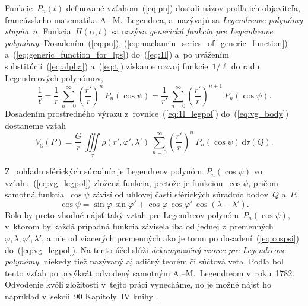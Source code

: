 \documentclass[a4paper, 12pt]{book}
\newcommand{\diff}{\mathrm d}
\newcommand{\gidx}{\mathrm g}
\begin{document}
Funkcie~$P_n(t)$ definované vzťahom~(\ref{eq:pn}) dostali názov podľa ich 
objaviteľa, francúzskeho matematika A.--M.~Legendrea, a~nazývajú sa 
\emph{Legendreove polynómy stupňa~$n$}.  Funkcia~$H(\alpha, t)$ sa nazýva 
\emph{generická funkcia pre Legendreove polynómy}.  Dosadením~(\ref{eq:pn}), 
(\ref{eq:maclaurin_series_of_generic_function}) 
a~(\ref{eq:generic_function_for_lps}) do~(\ref{eq:1l}) a~po uvážením 
substitúcií~(\ref{eq:alpha}) a~(\ref{eq:t}) získame rozvoj funkcie~$1 \slash 
\ell$ do radu Legendreových polynómov,
%
\begin{equation}
\label{eq:1l_legpol}
\frac{1}{\ell} = \frac{1}{r} \, \sum_{n = 0}^\infty \left( \frac{r'}{r} 
\right)^{n} \, P_n(\cos\psi) = \frac{1}{r'} \, \sum_{n = 0}^\infty \left( 
\frac{r'}{r} \right)^{n + 1} \, P_n(\cos\psi){.}
\end{equation}
%
Dosadením prostredného výrazu z~rovnice~(\ref{eq:1l_legpol}) 
do~(\ref{eq:vg_body})
dostaneme vzťah
%
\begin{equation}
\label{eq:vg_legpol}
V_\gidx(P) = \frac{G}{r} \, \iiint\limits_{\tau} \rho(r', \varphi', \lambda') 
\, \sum_{n = 0}^{\infty} \left( \frac{r'}{r} \right)^n \, P_n(\cos\psi) \, 
\diff\tau(Q){.}
\end{equation}

Z~pohľadu sférických súradníc je Legendreov polynóm~$P_n(\cos\psi)$ vo 
vzťahu~(\ref{eq:vg_legpol}) zložená funkcia, pretože je funkciou~$\cos\psi$, 
pričom samotná funkcia~$\cos\psi$ závisí od uhlovej časti sférických súradníc 
bodov~$Q$ a~$P$,
%
\begin{equation}
\label{eq:cospsi}
\cos\psi = \sin\varphi \, \sin\varphi' + \cos\varphi \, \cos\varphi' \,
\cos(\lambda - \lambda'){.}
\end{equation}
%
Bolo by preto vhodné nájsť taký vzťah pre Legendreov polynóm~$P_n(\cos\psi)$,
v~ktorom by každá prípadná funkcia závisela iba od jednej z~premenných
$\varphi,  \lambda, \varphi', \lambda'$, a~nie od viacerých
premenných ako je tomu po dosadení~(\ref{eq:cospsi})
do~(\ref{eq:vg_legpol}).  Na tento účel slúži \emph{dekompozičný vzorec pre
Legendreove polynómy}, niekedy tiež nazývaný aj adičný teorém či súčtová veta.
Podľa \textcite{Hobson} bol tento vzťah po prvýkrát odvodený samotným
A.--M.~Legendreom v~roku~1782.  Odvodenie kvôli zložitosti v~tejto práci
vynecháme, no je možné nájsť ho napríklad v~sekcii~90 Kapitoly~IV knihy
\textcite{Hobson}.
\end{document}
